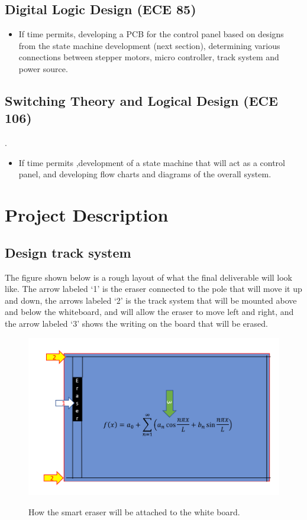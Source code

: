 \documentclass{IEEEtran}					%
\begin{document}
	\subsection{Digital Logic Design (ECE 85)}
	\begin{itemize}
		\item If time permits, developing a PCB for the control  panel based on designs from the state machine development (next section), determining various connections between stepper motors, micro controller, track system and power source.
	\end{itemize}
	\subsection{Switching Theory and Logical Design (ECE 106)}.
	\begin{itemize}
		\item If time permits ,development of a state machine that will act as a control panel, and developing flow charts and diagrams of the overall system.
	\end{itemize}
	\section{Project Description}
	\subsection{Design track system}
	The figure shown below is a rough layout of what the final deliverable will look like. The arrow labeled {\lq}1{\rq} is the eraser connected to the pole that will move it up and down, the arrows labeled {\lq}2{\rq} is the track system that will be mounted above and below the whiteboard, and will allow the eraser to move left and right, and the arrow labeled {\lq}3{\rq} shows the writing on the board that will be erased.
	\begin{figure}[h!]
	\resizebox{8cm}{!}
	{\includegraphics{Diargram one.png}}
	\caption{How the smart eraser will be attached to the white board.}
	\label{fig:look}
	\end{figure}
	
\end{document}
